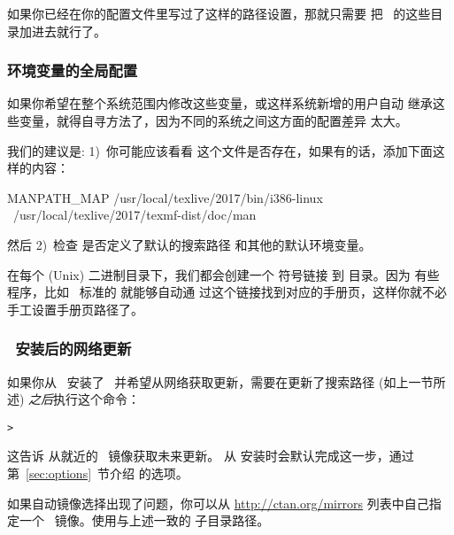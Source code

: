 \documentclass{article}
\begin{document}

如果你已经在你的配置文件里写过了这样的路径设置，那就只需要
把 \TL\ 的这些目录加进去就行了。

\subsubsection{环境变量的全局配置}
\label{sec:envglobal}

如果你希望在整个系统范围内修改这些变量，或这样系统新增的用户自动
继承这些变量，就得自寻方法了，因为不同的系统之间这方面的配置差异
太大。

我们的建议是: 1)~你可能应该看看 
这个文件是否存在，如果有的话，添加下面这样的内容：

\begin{sverbatim}
MANPATH_MAP /usr/local/texlive/2017/bin/i386-linux \
            /usr/local/texlive/2017/texmf-dist/doc/man
\end{sverbatim}

然后 2)~检查  是否定义了默认的搜索路径
和其他的默认环境变量。

在每个 (Unix) 二进制目录下，我们都会创建一个  符号链接
到  目录。因为
有些 \code{man} 程序，比如 \MacOSX\ 标准的  就能够自动通
过这个链接找到对应的手册页，这样你就不必手工设置手册页路径了。

\subsubsection{\DVD\ 安装后的网络更新}
\label{sec:dvd-install-net-updates}

如果你从 \DVD\ 安装了 \TL\ 并希望从网络获取更新，需要在更新了搜索路径
(如上一节所述) \emph{之后}执行这个命令：

\begin{alltt}
> 
\end{alltt}

这告诉  从就近的 \CTAN\ 镜像获取未来更新。
从 \DVD{} 安装时会默认完成这一步，通过第~\ref{sec:options}~节介绍
的选项。

如果自动镜像选择出现了问题，你可以从 \url{http://ctan.org/mirrors}
列表中自己指定一个 \CTAN\ 镜像。使用与上述一致的 
子目录路径。
\end{document}
